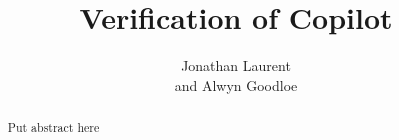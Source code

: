 \documentclass{nia}
\begin{document}
\title[This work was supported by the National Aeronautics
and Space Administration, Langley Research Center under the Research
Cooperative Agreement No. NCC-1-02043.]
{Verification of Copilot}
\author{Jonathan Laurent\address{\'{E}cole Normale Sup\'{e}rieure Paris Email:~}  and 
        Alwyn Goodloe  \address{NASA Langley Research Center Email:~}} 


\begin{abstract}

Put abstract here
\end{abstract}
















 


\end{document}
